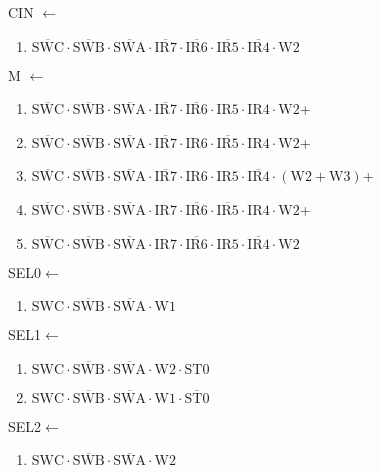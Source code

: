\documentclass[UTF8]{ctexart}
\begin{document}
CIN $\leftarrow$
\begin{enumerate}[\indent\indent]
	\item $\overline{\text{SWC}} \cdot\overline{\text{SWB}}\cdot \overline{\text{SWA}} \cdot \overline{\text{IR7}} \cdot \overline{\text{IR6}} \cdot \overline{\text{IR5}} \cdot \overline{\text{IR4}} \cdot \text{W2}$
\end{enumerate}
M $\leftarrow$
\begin{enumerate}[\indent\indent]
	\item $\overline{\text{SWC}} \cdot\overline{\text{SWB}}\cdot \overline{\text{SWA}} \cdot \overline{\text{IR7}} \cdot \overline{\text{IR6}} \cdot \text{IR5} \cdot \text{IR4} \cdot \text{W2}$+
	\item $\overline{\text{SWC}} \cdot\overline{\text{SWB}}\cdot \overline{\text{SWA}} \cdot \overline{\text{IR7}} \cdot \text{IR6} \cdot \overline{\text{IR5}} \cdot \text{IR4} \cdot \text{W2}$+
	\item $\overline{\text{SWC}} \cdot\overline{\text{SWB}}\cdot \overline{\text{SWA}} \cdot \overline{\text{IR7}} \cdot \text{IR6} \cdot \text{IR5} \cdot \overline{\text{IR4}} \cdot (\text{W2} + \text{W3})$+
	\item $\overline{\text{SWC}} \cdot\overline{\text{SWB}}\cdot \overline{\text{SWA}} \cdot \text{IR7} \cdot \overline{\text{IR6}} \cdot \overline{\text{IR5}} \cdot \text{IR4} \cdot \text{W2}$+
	\item $\overline{\text{SWC}} \cdot\overline{\text{SWB}}\cdot \overline{\text{SWA}} \cdot \text{IR7} \cdot \overline{\text{IR6}} \cdot \text{IR5} \cdot \overline{\text{IR4}} \cdot \text{W2}$
\end{enumerate}
SEL0$\leftarrow$
\begin{enumerate}[\indent\indent]
	\item$\text{SWC}\cdot\overline{\text{SWB}}\cdot\overline{\text{SWA}}\cdot\text{W1}$
\end{enumerate}
SEL1$\leftarrow$
\begin{enumerate}[\indent\indent]
	\item$\text{SWC}\cdot\overline{\text{SWB}}\cdot\overline{\text{SWA}}\cdot\text{W2}\cdot\text{ST0}$
	\item$\text{SWC}\cdot\overline{\text{SWB}}\cdot\overline{\text{SWA}}\cdot\text{W1}\cdot\overline{\text{ST0}}$
\end{enumerate}
SEL2$\leftarrow$
\begin{enumerate}[\indent\indent]
	\item$\text{SWC}\cdot\overline{\text{SWB}}\cdot\overline{\text{SWA}}\cdot\text{W2}$
\end{enumerate}
\end{document}
